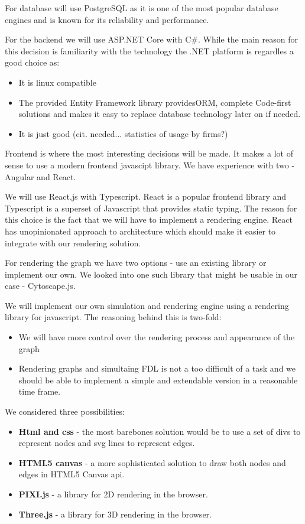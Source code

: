 For database will use PostgreSQL as it is one of the most popular database engines and is known for its reliability and performance.

For the backend we will use ASP.NET Core with C\#.
While the main reason for this decision is familiarity with the technology the .NET platform is regardles a good choice as:
\begin{itemize}
    \item It is linux compatible
    \item The provided Entity Framework library providesORM, complete Code-first solutions and makes it easy to replace database technology later on if needed.
    \item It is just good (cit. needed... statistics of usage by firms?)
\end{itemize}

Frontend is where the most interesting decisions will be made. It makes a lot of sense to use a modern frontend javascipt library.
We have experience with two - Angular and React.

We will use React.js with Typescript. React is a popular frontend library and Typescript is a superset of Javascript that provides static typing.
The reason for this choice is the fact that we will have to implement a rendering engine.
React has unopinionated approach to architecture which should make it easier to integrate with our rendering solution.


For rendering the graph we have two options - use an existing library or implement our own.
We looked into one such library that might be usable in our case - Cytoscape.js.

We will implement our own simulation and rendering engine using a rendering library for javascript. The reasoning behind this is two-fold:
\begin{itemize}
    \item We will have more control over the rendering process and appearance of the graph
    \item Rendering graphs and simultaing FDL is not a too difficult of a task and we should be able to implement a simple and extendable version in a reasonable time frame.
\end{itemize}

We considered three possibilities:
\begin{itemize}
    \item \textbf{Html and css} - the most barebones solution would be to use a set of divs to represent nodes and svg lines to represent edges.
    \item \textbf{HTML5 canvas} - a more sophisticated solution to draw both nodes and edges in HTML5 Canvas api.
    \item \textbf{PIXI.js} - a library for 2D rendering in the browser.
    \item \textbf{Three.js} - a library for 3D rendering in the browser.
\end{itemize}


